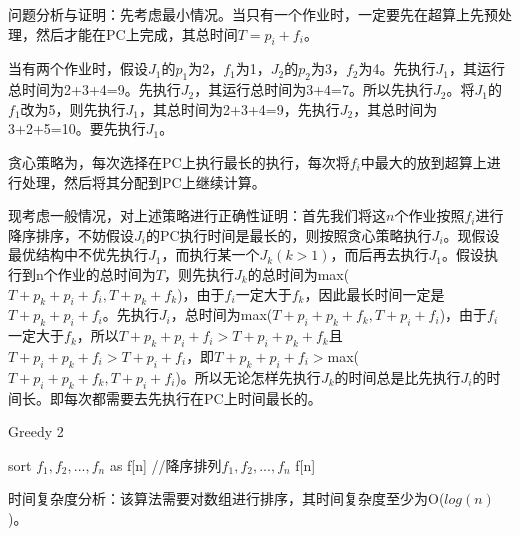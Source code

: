 \documentclass[12pt]{ctexart}
\begin{document}
\par 问题分析与证明：先考虑最小情况。当只有一个作业时，一定要先在超算上先预处理，然后才能在PC上完成，其总时间$T=p_i+f_i$。
\par 当有两个作业时，假设$J_1$的$p_1$为2，$f_1$为1，$J_2$的$p_2$为3，$f_2$为4。先执行$J_1$，其运行总时间为2+3+4=9。先执行$J_2$，其运行总时间为3+4=7。所以先执行$J_2$。将$J_1$的$f_1$改为5，则先执行$J_1$，其总时间为2+3+4=9，先执行$J_2$，其总时间为3+2+5=10。要先执行$J_1$。
\par 贪心策略为，每次选择在PC上执行最长的执行，每次将$f_i$中最大的放到超算上进行处理，然后将其分配到PC上继续计算。
\par 现考虑一般情况，对上述策略进行正确性证明：首先我们将这$n$个作业按照$f_i$进行降序排序，不妨假设$J_i$的PC执行时间是最长的，则按照贪心策略执行$J_i$。现假设最优结构中不优先执行$J_1$，而执行某一个$J_k(k>1)$，而后再去执行$J_1$。假设执行到n个作业的总时间为$T$，则先执行$J_k$的总时间为max($T+p_k+p_i+f_i, T+p_k+f_k$)，由于$f_i$一定大于$f_k$，因此最长时间一定是$T+p_k+p_i+f_i$。先执行$J_i$，总时间为max($T+p_i+p_k+f_k, T+p_i+f_i$)，由于$f_i$一定大于$f_k$，所以$T+p_k+p_i+f_i > T+p_i+p_k+f_k$且$T+p_i+p_k+f_i > T+p_i+f_i$，即$T+p_k+p_i+f_i > $max($T+p_i+p_k+f_k, T+p_i+f_i$)。所以无论怎样先执行$J_k$的时间总是比先执行$J_i$的时间长。即每次都需要去先执行在PC上时间最长的。

\begin{algorithm}[h]
    \begin{algorithmic}[0] %
    \caption{Greedy 2}
    \State sort $f_1, f_2,...,f_n$ as f[n] //降序排列$f_1,f_2,...,f_n$
    \State \Return f[n]
    \end{algorithmic}
\end{algorithm}
\par 时间复杂度分析：该算法需要对数组进行排序，其时间复杂度至少为O($log(n)$)。
\end{document}
